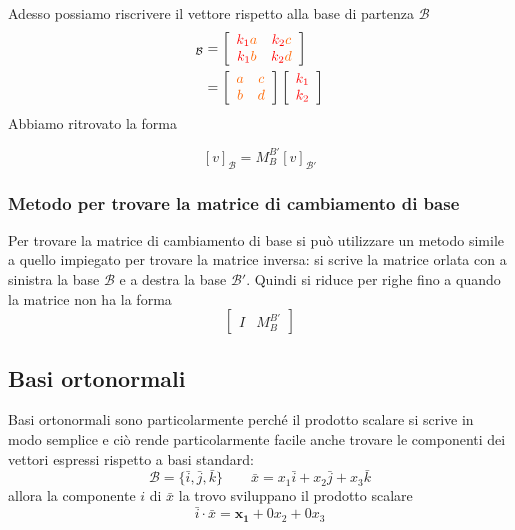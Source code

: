 \documentclass[x11names]{article}
\begin{document}
\begin{es}
	
Adesso possiamo riscrivere il vettore rispetto alla base di partenza $\mathcal{B}$
\begin{align*}
[v]_{\mathcal{B}} &= \left[\begin{array}{cc}
	\textcolor{red}{k_{1}}\textcolor{myorange}{a} & \textcolor{red}{k_{2}}\textcolor{myorange}{c} \\
	\textcolor{red}{k_{1}}\textcolor{myorange}{b} & \textcolor{red}{k_{2}}\textcolor{myorange}{d}
\end{array}\right] \\
	&=\left[\begin{array}{cc}
		\textcolor{myorange}{a} & \textcolor{myorange}{c} \\
		\textcolor{myorange}{b} &\textcolor{myorange}{d}
	\end{array}\right]
	\left[
	\begin{array}{c}
		\textcolor{red}{k_{1}}\\
		\textcolor{red}{k_{2}}
	\end{array}\right]
\end{align*}
Abbiamo ritrovato la forma

\[
[v]_{\mathcal{B}} =  M_{B}^{B'} [v]_{\mathcal{B}'}
\] 

\end{es}

\subsubsection{Metodo per trovare la matrice di cambiamento di base}
Per trovare la matrice di cambiamento di base si può utilizzare un metodo simile a quello impiegato per trovare la matrice inversa: si scrive la matrice orlata con a sinistra la base $\mathscr{B}$ e a destra la base $\mathscr{B}'$. Quindi si riduce per righe fino a quando la matrice non ha la forma
\[
	\left[\begin{array}{c|c}
			I & M_{B}^{B'}
	\end{array}\right]
\] 

\subsection{Basi ortonormali}
Basi ortonormali sono particolarmente perché il prodotto scalare si scrive in modo semplice e ciò rende particolarmente facile anche trovare le componenti dei vettori espressi rispetto a basi standard:
\[
\mathcal{B} = \{\bar{i},\bar{j},\bar{k}\} \qquad \bar{x} = x_{1}\bar{i} + x_{2}\bar{j} +x_{3}\bar{k}
\]
allora la componente $i$ di $\bar{x}$ la trovo sviluppano il prodotto scalare 
\[
\bar{i} \cdot \bar{x} = \mathbf{x_{1}} + 0x_{2} + 0x_{3}
\]
\end{document}
